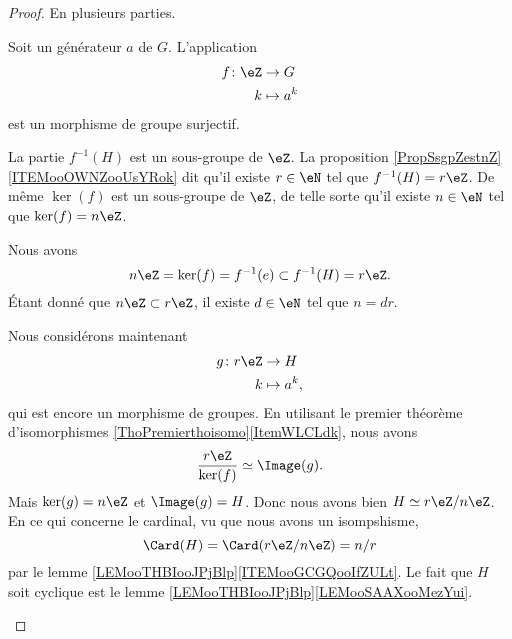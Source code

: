\begin{proof}
    En plusieurs parties.
    \begin{subproof}
        Soit un générateur \( a\) de \( G\). L'application 
        \begin{equation}
            \begin{aligned}
                f\colon \eZ&\to G \\
                k&\mapsto a^k 
            \end{aligned}
        \end{equation}
        est un morphisme de groupe surjectif.

        La partie \( f^{-1}(H)\) est un sous-groupe de \( \eZ\). La proposition \ref{PropSsgpZestnZ}\ref{ITEMooOWNZooUsYRok} dit qu'il existe \( r\in \eN\) tel que \( f^{-1}(H)=r\eZ\). De même \( \ker(f)\) est un sous-groupe de \( \eZ\), de telle sorte qu'il existe \( n\in \eN\) tel que \( \ker(f)=n\eZ\).

        Nous avons
        \begin{equation}
            n\eZ=\ker(f)=f^{-1}(e)\subset f^{-1}(H)=r\eZ.
        \end{equation}
        Étant donné que \( n\eZ\subset r\eZ\), il existe \( d\in \eN\) tel que \( n=dr\).

        Nous considérons maintenant 
        \begin{equation}
            \begin{aligned}
                g\colon r\eZ&\to H \\
                k&\mapsto a^k,
            \end{aligned}
        \end{equation}
        qui est encore un morphisme de groupes. En utilisant le premier théorème d'isomorphismes \ref{ThoPremierthoisomo}\ref{ItemWLCLdk}, nous avons
        \begin{equation}
            \frac{ r\eZ }{ \ker(f) }\simeq\Image(g).
        \end{equation}
        Mais \( \ker(g)=n\eZ\) et \( \Image(g)=H\). Donc nous avons bien \( H\simeq r\eZ/n\eZ\).
        En ce qui concerne le cardinal, vu que nous avons un isompshisme,
        \begin{equation}
            \Card(H)=\Card(r\eZ/n\eZ)=n/r
        \end{equation}
        par le lemme \ref{LEMooTHBIooJPjBlp}\ref{ITEMooGCGQooIfZULt}.
        Le fait que \( H\) soit cyclique est le lemme \ref{LEMooTHBIooJPjBlp}\ref{LEMooSAAXooMezYui}.
    \end{subproof}
\end{proof}

